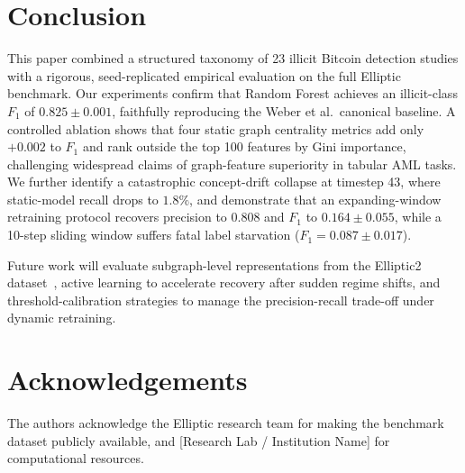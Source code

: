 \documentclass[conference]{IEEEtran}
\begin{document}
\section{Conclusion}
\label{sec:conclusion}

This paper combined a structured taxonomy of 23 illicit Bitcoin detection
studies with a rigorous, seed-replicated empirical evaluation on the full
Elliptic benchmark.
Our experiments confirm that Random Forest achieves an illicit-class $F_1$
of $0.825 \pm 0.001$, faithfully reproducing the Weber et al.\ canonical
baseline.
A controlled ablation shows that four static graph centrality metrics add
only $+0.002$ to $F_1$ and rank outside the top 100 features by Gini
importance, challenging widespread claims of graph-feature superiority in
tabular AML tasks.
We further identify a catastrophic concept-drift collapse at timestep 43,
where static-model recall drops to $1.8\%$, and demonstrate that an
expanding-window retraining protocol recovers precision to $0.808$ and $F_1$
to $0.164 \pm 0.055$, while a 10-step sliding window suffers fatal label
starvation ($F_1 = 0.087 \pm 0.017$).

Future work will evaluate subgraph-level representations from the
Elliptic2 dataset~\cite{bellei2024shape}, active learning to accelerate
recovery after sudden regime shifts, and threshold-calibration strategies
to manage the precision-recall trade-off under dynamic retraining.

\section*{Acknowledgements}
The authors acknowledge the Elliptic research team for making the benchmark
dataset publicly available, and [Research Lab / Institution Name] for
computational resources.

\balance


\end{document}
